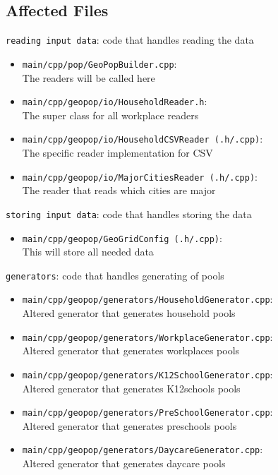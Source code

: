 \documentclass[runningheads]{llncs}
\begin{document}
	\subsection{Affected Files}
	\texttt{reading input data}: code that handles reading the data
	\begin{itemize}
		\item \texttt{main/cpp/pop/GeoPopBuilder.cpp}: \\
		The readers will be called here
		\item \texttt{main/cpp/geopop/io/HouseholdReader.h}: \\
		The super class for all workplace readers
		\item \texttt{main/cpp/geopop/io/HouseholdCSVReader (.h/.cpp)}: \\
		The specific reader implementation for CSV
		\item \texttt{main/cpp/geopop/io/MajorCitiesReader (.h/.cpp)}: \\
		The reader that reads which cities are major
	\end{itemize}
	\texttt{storing input data}: code that handles storing the data
	\begin{itemize}
		\item \texttt{main/cpp/geopop/GeoGridConfig (.h/.cpp)}: \\
		This will store all needed data
	\end{itemize}
	\texttt{generators}: code that handles generating of pools
	\begin{itemize}
		\item \texttt{main/cpp/geopop/generators/HouseholdGenerator.cpp}:\\
		Altered generator that generates household pools
		\item \texttt{main/cpp/geopop/generators/WorkplaceGenerator.cpp}:\\
		Altered generator that generates workplaces pools
		\item \texttt{main/cpp/geopop/generators/K12SchoolGenerator.cpp}:\\
		Altered generator that generates K12schools pools
		\item \texttt{main/cpp/geopop/generators/PreSchoolGenerator.cpp}:\\
		Altered generator that generates preschools pools
		\item \texttt{main/cpp/geopop/generators/DaycareGenerator.cpp}:\\
		Altered generator that generates daycare pools
	\end{itemize}
\end{document}
